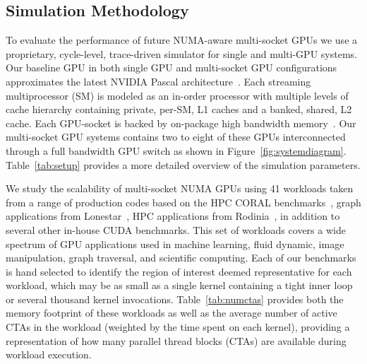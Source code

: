 \subsection{Simulation Methodology}
\label{sec:methodology}

To evaluate the performance of future NUMA-aware multi-socket GPUs we use a 
proprietary, cycle-level, trace-driven simulator for single and multi-GPU 
systems. Our baseline GPU in both single GPU and multi-socket GPU 
configurations approximates the latest NVIDIA Pascal 
architecture~\cite{pascal-tesla-wp}. Each streaming multiprocessor (SM) is 
modeled as an in-order processor with multiple levels of cache hierarchy
containing private, per-SM, L1 caches and a banked, shared, L2 cache. Each 
GPU-socket is backed by on-package high bandwidth memory~\cite{HBM}. Our 
multi-socket GPU systems contains two to eight of these GPUs interconnected 
through a full bandwidth GPU switch as shown in Figure~\ref{fig:systemdiagram}. 
Table~\ref{tab:setup} provides a more detailed overview of the simulation 
parameters.

We study the scalability of multi-socket NUMA GPUs using 41 workloads 
taken from a range of 
production codes based on the HPC CORAL benchmarks~\cite{coral}, graph 
applications from Lonestar~\cite{lonestar}, HPC applications from 
Rodinia~\cite{Che2009}, in addition to several other in-house CUDA benchmarks. 
This set of workloads covers a wide spectrum of GPU applications used in 
machine learning, fluid dynamic, image manipulation, graph traversal, and
scientific computing.  Each of our benchmarks is hand selected to identify
the region of interest deemed representative for each workload, which may
be as small as a single kernel containing a tight inner loop or several thousand
kernel invocations. Table~\ref{tab:numctas} provides both the memory footprint
of these workloads as well as the average number of active CTAs in the workload
(weighted by the time spent on each kernel), providing a representation of 
how many parallel thread blocks (CTAs) are available during workload execution.

